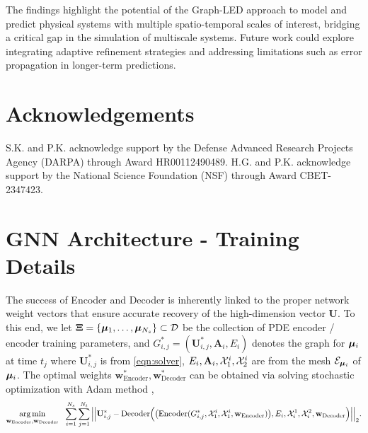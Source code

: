 \documentclass{article}
\begin{document}
The findings highlight the potential of the Graph-LED approach to model and predict physical systems with multiple spatio-temporal scales of interest, bridging a critical gap in the simulation of multiscale systems. Future work could explore integrating adaptive refinement strategies and addressing limitations such as error propagation in longer-term predictions.

\section*{Acknowledgements}
S.K. and P.K. acknowledge support by the Defense Advanced Research Projects Agency (DARPA) through Award
HR00112490489. H.G. and P.K. acknowledge support by the National Science Foundation (NSF) through Award CBET-2347423.










\newpage
\appendix
\section{GNN Architecture - Training Details}
\label{sec:GNN_train}
The success of Encoder and Decoder is inherently linked to the proper network weight vectors that ensure accurate recovery of the high-dimension vector $\mathbf{U}$. To this end, we let $\mathbf{\Xi}=\{{\boldsymbol{\mu}}_1,\dots,{\boldsymbol{\mu}}_{N_s}\}\subset\mathcal{D}$ be the collection of PDE encoder / encoder training parameters, and $G_{i,j}^*=(\mathbf{U}^*_{i,j},\mathbf{A}_{i},E_i)$ denotes the graph for ${\boldsymbol{\mu}}_i$ at time $t_j$ where $\mathbf{U}^*_{i,j}$ is from \eqref{eqn:solver}, $E_i, \mathbf{A}_i, \mathcal{X}_1^i, \mathcal{X}_2^i$ are from the mesh $\mathcal{E}_{{\boldsymbol{\mu}}_i}$ of ${\boldsymbol{\mu}}_i$. The optimal weights $\mathbf{w}_\mathrm{Encoder}^*,\mathbf{w}_\mathrm{Decoder}^*$ can be obtained via solving stochastic optimization with Adam method \cite{kingma2014adam},
    \begin{equation}
\begin{split}
\underset{\mathbf{w}_\mathrm{Encoder},\mathbf{w}_\mathrm{Decoder}}{\arg\min} ~~ \sum_{i=1}^{N_s}\sum_{j=1}^{N_t}\Big|\Big|\mathbf{U}^*_{i,j}-\mathrm{Decoder}\Big( 
        \big(\mathrm{Encoder}(G^*_{i,j},\mathcal{X}^i_1,\mathcal{X}^i_1,\mathbf{w}_\mathrm{Encoder})\big),E_i,\mathcal{X}^1_i,\mathcal{X}^2_i,\mathbf{w}_\mathrm{Decoder}\Big)\Big|\Big|_2
       .
\end{split}
    \end{equation}
\end{document}
